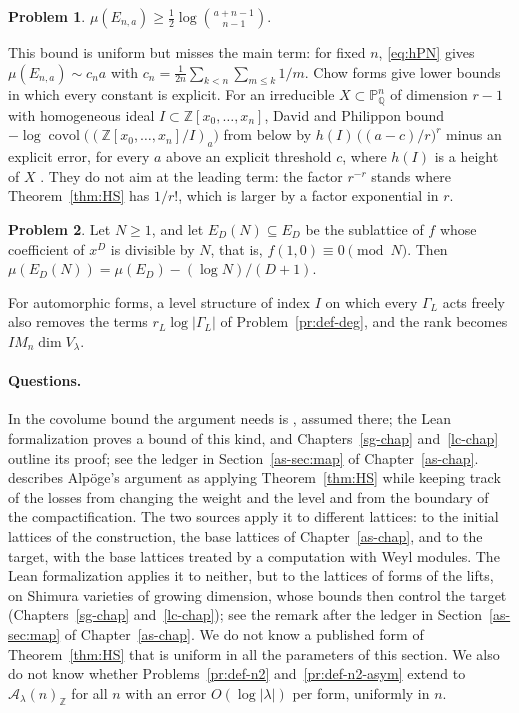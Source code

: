 \documentclass[reqno]{amsart}
\newcounter{chap}
\theoremstyle{definition}
\newtheorem{problem}{Problem}[section]
\theoremstyle{plain}
\newcommand{\Z}{\mathbb{Z}}
\newcommand{\Q}{\mathbb{Q}}
\newcommand{\Pb}{\mathbb{P}}
\newcommand{\Ac}{\mathcal{A}}
\newcommand{\covol}{\operatorname{covol}}
\begin{document}
\begin{problem}\label{pr:trivial-lower}
\(\mu(E_{n,a}) \ge \tfrac12\log\binom{a+n-1}{n-1}\).
\end{problem}

This bound is uniform but misses the main term: for fixed \(n\), \eqref{eq:hPN} gives \(\mu(E_{n,a}) \sim c_n a\) with \(c_n = \tfrac{1}{2n}\sum_{k<n}\sum_{m \le k} 1/m\).  Chow forms give lower bounds in which every constant is explicit.  For an irreducible \(X \subset \Pb^n_\Q\) of dimension \(r - 1\) with homogeneous ideal \(I \subset \Z[x_0, \dots, x_n]\), David and Philippon bound \(-\log\covol\bigl((\Z[x_0, \dots, x_n]/I)_a\bigr)\) from below by \(h(I)\,\bigl((a - c)/r\bigr)^r\) minus an explicit error, for every \(a\) above an explicit threshold \(c\), where \(h(I)\) is a height of \(X\) \cite[Prop.~4.10 and Cor.~4.11]{DPh}.  They do not aim at the leading term: the factor \(r^{-r}\) stands where Theorem~\ref{thm:HS} has \(1/r!\), which is larger by a factor exponential in \(r\).

\begin{problem}\label{pr:level}
Let \(N \ge 1\), and let \(E_D(N) \subseteq E_D\) be the sublattice of \(f\) whose coefficient of \(x^D\) is divisible by \(N\), that is, \(f(1,0) \equiv 0 \pmod N\).  Then \(\mu(E_D(N)) = \mu(E_D) - (\log N)/(D+1)\).
\end{problem}

For automorphic forms, a level structure of index \(I\) on which every \(\Gamma_L\) acts freely also removes the terms \(r_L\log\lvert\Gamma_L\rvert\) of Problem~\ref{pr:def-deg}, and the rank becomes \(I M_n \dim V_\lambda\).

\paragraph{Questions.}
In \cite{Adr} the covolume bound the argument needs is \cite[Hyp.~15.58]{Adr}, assumed there; the Lean formalization proves a bound of this kind, and Chapters~\ref{sg-chap} and~\ref{lc-chap} outline its proof; see the ledger in Section~\ref{as-sec:map} of Chapter~\ref{as-chap}.  \cite[\S4.3]{Zh} describes Alpöge's argument as applying Theorem~\ref{thm:HS} while keeping track of the losses from changing the weight and the level and from the boundary of the compactification.  The two sources apply it to different lattices: \cite[\S4.3]{Zh} to the initial lattices of the construction, the base lattices of Chapter~\ref{as-chap}, and \cite[\S15]{Adr} to the target, with the base lattices treated by a computation with Weyl modules.  The Lean formalization applies it to neither, but to the lattices of forms of the lifts, on Shimura varieties of growing dimension, whose bounds then control the target (Chapters~\ref{sg-chap} and~\ref{lc-chap}); see the remark after the ledger in Section~\ref{as-sec:map} of Chapter~\ref{as-chap}.  We do not know a published form of Theorem~\ref{thm:HS} that is uniform in all the parameters of this section.  We also do not know whether Problems~\ref{pr:def-n2} and~\ref{pr:def-n2-asym} extend to \(\Ac_\lambda(n)_\Z\) for all \(n\) with an error \(O(\log\lvert\lambda\rvert)\) per form, uniformly in \(n\).
\end{document}
